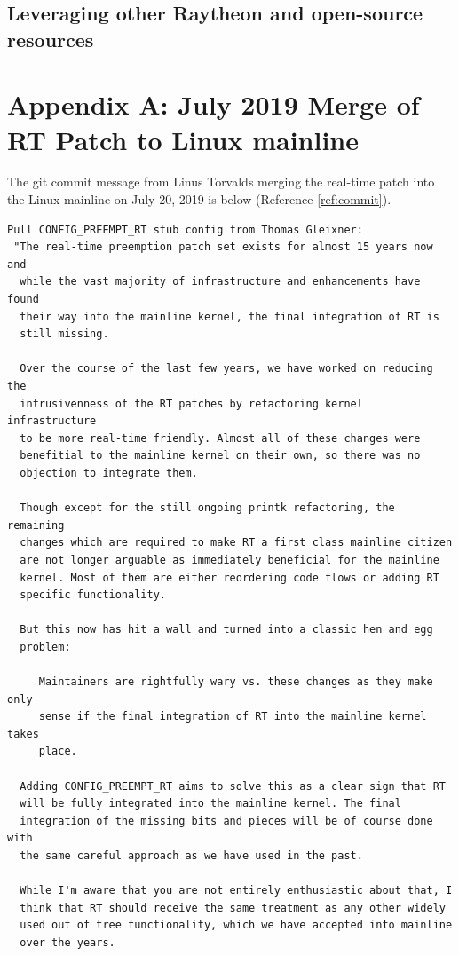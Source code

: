 \documentclass[12pt]{article}
\begin{document}
\subsection{Leveraging other Raytheon and open-source resources}


%
\newpage
\section{Appendix A: July 2019 Merge of RT Patch to Linux mainline}

The git commit message from Linus Torvalds merging the real-time patch
into the Linux mainline on July 20, 2019 is below (Reference \ref{ref:commit}).

\begin{verbatim}
Pull CONFIG_PREEMPT_RT stub config from Thomas Gleixner:
 "The real-time preemption patch set exists for almost 15 years now and
  while the vast majority of infrastructure and enhancements have found
  their way into the mainline kernel, the final integration of RT is
  still missing.

  Over the course of the last few years, we have worked on reducing the
  intrusivenness of the RT patches by refactoring kernel infrastructure
  to be more real-time friendly. Almost all of these changes were
  benefitial to the mainline kernel on their own, so there was no
  objection to integrate them.

  Though except for the still ongoing printk refactoring, the remaining
  changes which are required to make RT a first class mainline citizen
  are not longer arguable as immediately beneficial for the mainline
  kernel. Most of them are either reordering code flows or adding RT
  specific functionality.

  But this now has hit a wall and turned into a classic hen and egg
  problem:

     Maintainers are rightfully wary vs. these changes as they make only
     sense if the final integration of RT into the mainline kernel takes
     place.

  Adding CONFIG_PREEMPT_RT aims to solve this as a clear sign that RT
  will be fully integrated into the mainline kernel. The final
  integration of the missing bits and pieces will be of course done with
  the same careful approach as we have used in the past.

  While I'm aware that you are not entirely enthusiastic about that, I
  think that RT should receive the same treatment as any other widely
  used out of tree functionality, which we have accepted into mainline
  over the years.


\end{verbatim}
\end{document}
